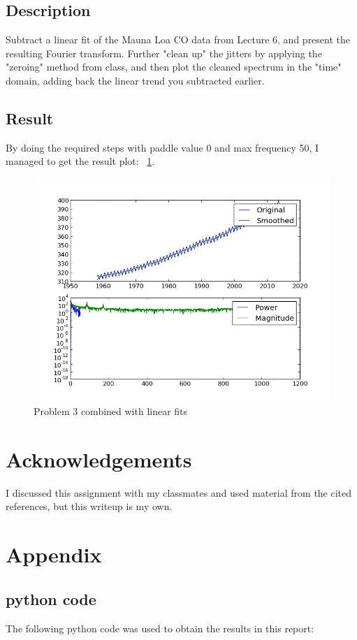 \documentclass[11pt,letterpaper]{article}
\begin{document}
\subsection{Description}
Subtract a linear fit of the Mauna Loa CO   data from Lecture 6, and present the resulting Fourier transform. Further "clean up" the jitters by applying the "zeroing" method from class, and then plot the cleaned spectrum in the "time" domain, adding back the linear trend you subtracted earlier. 

\subsection{Result}

By doing the required steps with paddle value 0 and max frequency 50, I managed to get the result plot: ~\ref{figure3}.   



\begin{figure}
\begin{center}
\includegraphics[width=0.9\linewidth,angle=0]{p3.png}
\caption{Problem 3 combined with linear fits }
\label{figure3}
\end{center}
\end{figure}






\newpage
\section*{Acknowledgements}

I discussed this assignment with my classmates and used material from the
cited references, but this writeup is my own.



\newpage
\appendix
\section{Appendix}

\subsection{python code}

The following python code was used to obtain the results in this report:






\end{document}
